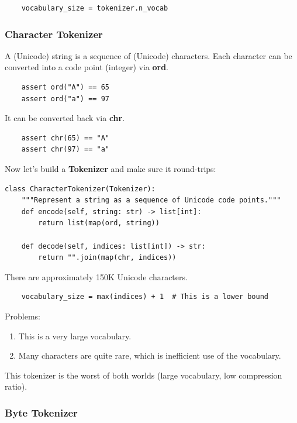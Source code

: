 \documentclass[12pt,twoside]{article}
\begin{document}
\begin{verbatim}
    vocabulary_size = tokenizer.n_vocab
\end{verbatim}

\subsubsection*{Character Tokenizer}

A (Unicode) string is a sequence of (Unicode) characters. Each character can be converted into a code point (integer) via \textbf{ord}.

\begin{verbatim}
    assert ord("A") == 65
    assert ord("a") == 97
\end{verbatim}

It can be converted back via \textbf{chr}.

\begin{verbatim}
    assert chr(65) == "A"
    assert chr(97) == "a"
\end{verbatim}

Now let's build a \textbf{Tokenizer} and make sure it round-trips:

\begin{verbatim}
class CharacterTokenizer(Tokenizer):
    """Represent a string as a sequence of Unicode code points."""
    def encode(self, string: str) -> list[int]:
        return list(map(ord, string))
    
    def decode(self, indices: list[int]) -> str:
        return "".join(map(chr, indices))
\end{verbatim}

There are approximately 150K Unicode characters. 

\begin{verbatim}
    vocabulary_size = max(indices) + 1  # This is a lower bound
\end{verbatim}

Problems:

\begin{enumerate}
    \item This is a very large vocabulary.
    \item Many characters are quite rare, which is inefficient use of the vocabulary.
\end{enumerate}

This tokenizer is the worst of both worlds (large vocabulary, low compression ratio).

\subsubsection*{Byte Tokenizer}
\end{document}
